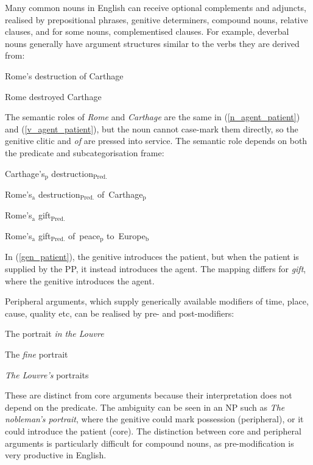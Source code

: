 \documentclass[11pt]{article}
\begin{document}
Many common nouns in English can receive optional complements and adjuncts,
realised by prepositional phrases, genitive determiners, compound nouns, relative clauses, and for
some nouns, complementised clauses. For example, deverbal nouns
generally have argument structures similar to the verbs they are derived from:
\vspace{-0.03in}
\begin{lexamples}
\addtolength{\itemsep}{-.99\itemsep}
 \item Rome's destruction of Carthage\label{n_agent_patient}
 \item Rome destroyed Carthage\label{v_agent_patient}
\end{lexamples}
\vspace{-0.03in}
The semantic roles of \emph{Rome} and \emph{Carthage} are the same in
(\ref{n_agent_patient}) and (\ref{v_agent_patient}), but the noun cannot
case-mark them directly, so the genitive clitic and \emph{of} are pressed into
service. The semantic role depends on both the predicate and subcategorisation
frame:
\begin{lexamples}
\addtolength{\itemsep}{-.99\itemsep}
 \item Carthage's$_\mathrm{p}$ destruction$_\mathrm{Pred.}$\label{gen_patient}
 \item Rome's$_\mathrm{a}$ destruction$_\mathrm{Pred.}$ of~Carthage$_\mathrm{p}$\label{gen_agent_patient}
 \item Rome's$_\mathrm{a}$ gift$_\mathrm{Pred.}$\label{agent_patient}
 \item Rome's$_\mathrm{a}$ gift$_\mathrm{Pred.}$ of~peace$_\mathrm{p}$ to~Europe$_\mathrm{b}$\label{agent_patient_ben}
\end{lexamples}

In (\ref{gen_patient}), the genitive introduces the patient, but when the patient is
supplied by the PP, it instead introduces the agent. The mapping differs for
\emph{gift}, where the genitive introduces the agent.

Peripheral arguments, which supply generically available modifiers of time,
place, cause, quality etc, can be realised by pre- and post-modifiers:
\vspace{-0.03in}
\begin{lexamples}
\addtolength{\itemsep}{-.99\itemsep}
 \item The portrait \emph{in the Louvre}
 \item The \emph{fine} portrait
 \item \emph{The Louvre's} portraits
\end{lexamples}
\vspace{-0.03in}
These are distinct from core arguments because their interpretation does not
depend on the predicate. The ambiguity can be seen in an NP such as
\emph{The nobleman's portrait}, where the genitive could mark
possession (peripheral), or it could introduce the patient (core).
The distinction between core and peripheral arguments is particularly difficult
for compound nouns, as pre-modification is very productive in English.
\end{document}
